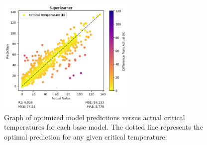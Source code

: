 \documentclass[twocolumn, nofootinbib, secnumarabic, amssymb, nobibnotes, aps, prd]{revtex4-2}
\begin{document}
\begin{figure}[t]
   \includegraphics[height=2.23in]{images/subfigures/no_uncertainty/superlearner.png}
   \caption{Graph of optimized model predictions versus actual critical temperatures for each base model. The dotted line represents the optimal prediction for any given critical temperature.}
\end{figure}\label{fig:results}
\end{document}

